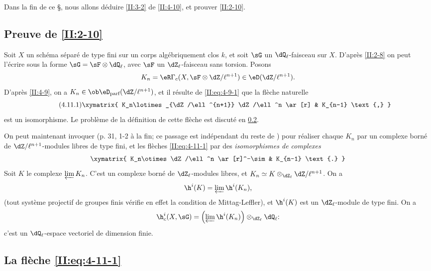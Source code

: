 Dans la fin de ce \S, nous allons déduire \ref{II:3-2} de \ref{II:4-10}, et 
prouver \ref{II:2-10}. 





\subsection{Preuve de \texorpdfstring{\ref{II:2-10}}{2.10}}\label{II:4-11}

Soit $X$ un schéma séparé de type fini sur un corps algébriquement clos 
$k$, et soit $\sG$ un $\dQ_\ell$-faisceau sur $X$. D'après \ref{II:2-8} on 
peut l'écrire sous la forme $\sG=\sF\otimes\dQ_\ell$, avec $\sF$ un 
$\dZ_\ell$-faisceau sans torsion. Posons 
\[
  K_n = \eR \Gamma_c(X,\sF\otimes\dZ/\ell^{n+1})\in\eD(\dZ/\ell^{n+1}) \text{.}
\]
D'après \ref{II:4-9}, on a $K_n\in\ob\eD_\text{parf}(\dZ/\ell^{n+1})$, et il 
résulte de \eqref{II:eq:4-9-1} que la flèche naturelle 
\begin{equation*}\tag{4.11.1}\label{II:eq:4-11-1}
\xymatrix{
  K_n\lotimes_{\dZ/\ell^{n+1}} \dZ/\ell^n \ar[r] & K_{n-1} \text{,}
}
\end{equation*}
est un isomorphisme. Le problème de la définition de cette flèche est 
discuté en \ref{II:4-12}. 

On peut maintenant invoquer  (p. 31, 1-2 à la fin; ce 
passage est indépendant du reste de ) pour réaliser chaque 
$K_n$ par un complexe borné de $\dZ/\ell^{n+1}$-modules libres de type fini, 
et les flèches \eqref{II:eq:4-11-1} par des \emph{isomorphismes de complexes} 
\[\xymatrix{
  K_n\otimes \dZ/\ell^n \ar[r]^-\sim 
    & K_{n-1} \text{.}
}\]
Soit $K$ le complexe $\varprojlim K_n$. C'est un complexe borné de 
$\dZ_\ell$-modules libres, et $K_n\simeq K\otimes_{\dZ_\ell}\dZ/\ell^{n+1}$. On 
a 
\[
  \h^i(K) = \varprojlim \h^i(K_n) \text{,}
\]
(tout système projectif de groupes finis vérifie en effet la condition de 
Mittag-Leffler), et $\h^i(K)$ est un $\dZ_\ell$-module de type fini. On a 
\[
  \h_c^i(X,\sG) = \left(\varprojlim \h^i(K_n) \right)\otimes_{\dZ_\ell} \dQ_\ell \text{:}
\]
c'est un $\dQ_\ell$-espace vectoriel de dimension finie. 





\subsection{La flèche \texorpdfstring{\eqref{II:eq:4-11-1}}{(4.11.1)}}\label{II:4-12}

